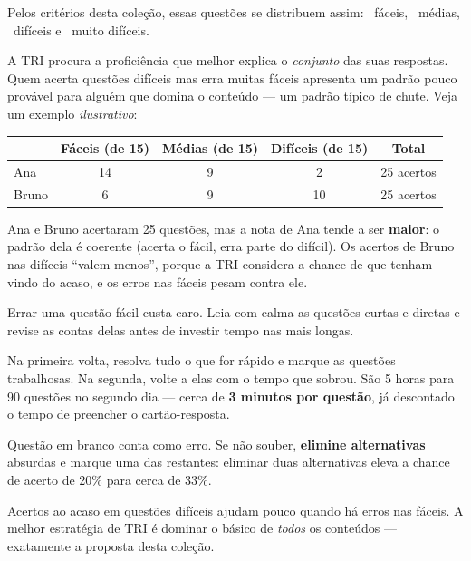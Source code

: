 Pelos critérios desta coleção, essas questões se distribuem assim:
\textcolor{nivelA}{\faSquare}\,\textbf{\trinA} fáceis,
\textcolor{nivelB}{\faSquare}\,\textbf{\trinB} médias,
\textcolor{nivelC}{\faSquare}\,\textbf{\trinC} difíceis e
\textcolor{nivelD}{\faSquare}\,\textbf{\trinD} muito difíceis.


A TRI procura a proficiência que melhor explica o \emph{conjunto} das suas respostas. Quem acerta
questões difíceis mas erra muitas fáceis apresenta um padrão pouco provável para alguém que domina o
conteúdo — um padrão típico de chute. Veja um exemplo \emph{ilustrativo}:

\begin{center}
\renewcommand\arraystretch{1.35}
\begin{tabular}{@{}lcccc@{}}
\toprule
& \textbf{Fáceis} (de 15) & \textbf{Médias} (de 15) & \textbf{Difíceis} (de 15) & \textbf{Total} \\
\midrule
Ana   & 14 & 9 & 2 & 25 acertos \\
Bruno & 6  & 9 & 10 & 25 acertos \\
\bottomrule
\end{tabular}
\end{center}

Ana e Bruno acertaram 25 questões, mas a nota de Ana tende a ser \textbf{maior}: o padrão dela é
coerente (acerta o fácil, erra parte do difícil). Os acertos de Bruno nas difíceis “valem menos”,
porque a TRI considera a chance de que tenham vindo do acaso, e os erros nas fáceis pesam contra ele.


\begin{dica}
Errar uma questão fácil custa caro. Leia com calma as questões curtas e diretas e revise as contas
delas antes de investir tempo nas mais longas.
\end{dica}
\begin{dica}
Na primeira volta, resolva tudo o que for rápido e marque as questões trabalhosas. Na segunda, volte
a elas com o tempo que sobrou. São 5 horas para 90 questões no segundo dia — cerca de
\textbf{3 minutos por questão}, já descontado o tempo de preencher o cartão-resposta.
\end{dica}
\begin{macete}
Questão em branco conta como erro. Se não souber, \textbf{elimine alternativas} absurdas e marque
uma das restantes: eliminar duas alternativas eleva a chance de acerto de 20\% para cerca de 33\%.
\end{macete}
\begin{atencao}
Acertos ao acaso em questões difíceis ajudam pouco quando há erros nas fáceis. A melhor estratégia
de TRI é dominar o básico de \emph{todos} os conteúdos — exatamente a proposta desta coleção.
\end{atencao}

